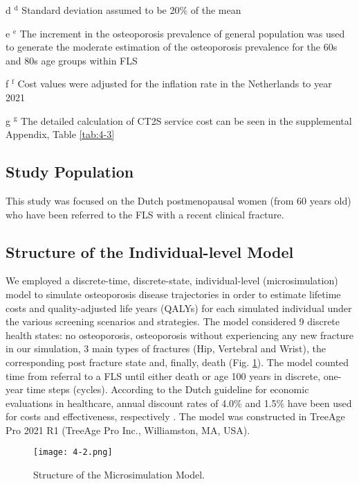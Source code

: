 \begin{center}
\begin{tablenotes}
\item[d]$^{\mathrm{d}}$ Standard deviation assumed to be 20\% of the mean
\item[e]$^{\mathrm{e}}$ The increment in the osteoporosis prevalence of general population was used to generate the moderate estimation of the osteoporosis prevalence for the 60s and 80s age groups within FLS
\item[f]$^{\mathrm{f}}$ Cost values were adjusted for the inflation rate in the Netherlands to year 2021
\item[g]$^{\mathrm{g}}$ The detailed calculation of CT2S service cost can be seen in the supplemental Appendix, Table \ref{tab:4-3}
\end{tablenotes}
\vspace{-2.5em}
\end{center}

\newpage
\subsection{Study Population}

This study was focused on the Dutch postmenopausal women (from 60 years old) who have been referred to the FLS with a recent clinical fracture.

\subsection{Structure of the Individual-level Model}

We employed a discrete-time, discrete-state, individual-level (microsimulation) model to simulate osteoporosis disease trajectories in order to estimate lifetime costs and quality-adjusted life years (QALYs) for each simulated individual under the various screening scenarios and strategies. The model considered 9 discrete health states: no osteoporosis, osteoporosis without experiencing any new fracture in our simulation, 3 main types of fractures (Hip, Vertebral and Wrist), the corresponding post fracture state and, finally, death (Fig. \ref{fig:4-2}). The model counted time from referral to a FLS until either death or age 100 years in discrete, one-year time steps (cycles). According to the Dutch guideline for economic evaluations in healthcare, annual discount rates of 4.0\% and 1.5\% have been used for costs and effectiveness, respectively \cite{4-14}. The model was constructed in TreeAge Pro 2021 R1 (TreeAge Pro Inc., Williamston, MA, USA).

\begin{figure}[!h]
\centering
\texttt{[image: 4-2.png]}
\caption{Structure of the Microsimulation Model.}
\label{fig:4-2}
\end{figure}

